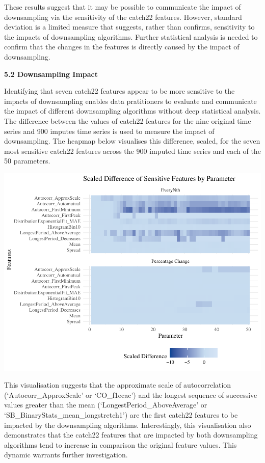 \documentclass{article}
\begin{document}
These results suggest that it may be possible to communicate the impact
of downsampling via the sensitivity of the catch22 features. However,
standard deviation is a limited measure that suggests, rather than
confirms, sensitivity to the impacts of downsampling algorithms. Further
statistical analysis is needed to confirm that the changes in the
features is directly caused by the impact of downsampling.

\textbf{5.2 Downsampling Impact}

Identifying that seven catch22 features appear to be more sensitive to
the impacts of downsampling enables data pratitioners to evaluate and
communicate the impact of different downsampling algorithms without deep
statistical analysis. The difference between the values of catch22
features for the nine original time series and 900 imputes time series
is used to measure the impact of downsampling. The heapmap below
visualises this difference, scaled, for the seven most sensitive catch22
features across the 900 imputed time series and each of the 50
parameters.

\includegraphics{210431461_CSC8639_Dissertation_files/figure-latex/Heatmap_param-1.pdf}

This visualisation suggests that the approximate scale of
autocorrelation (`Autocorr\_ApproxScale' or `CO\_f1ecac') and the
longest sequence of successive values greater than the mean
(`LongestPeriod\_AboveAverage' or `SB\_BinaryStats\_mean\_longstretch1')
are the first catch22 features to be impacted by the downsampling
algorithms. Interestingly, this visualisation also demonstrates that the
catch22 features that are impacted by both downsampling algorithms tend
to increase in comparison the original feature values. This dynamic
warrants further investigation.
\end{document}
